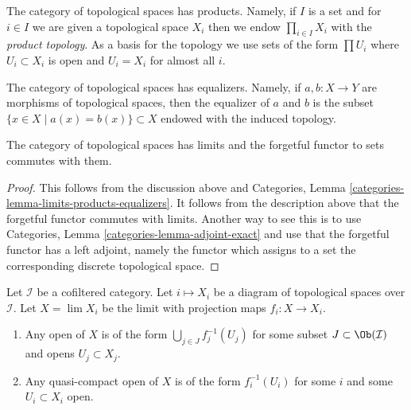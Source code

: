 \noindent
The category of topological spaces has products. Namely, if $I$ is a set
and for $i \in I$ we are given a topological space $X_i$ then we endow
$\prod_{i \in I} X_i$ with the {\it product topology}. As a basis for
the topology we use sets of the form $\prod U_i$ where $U_i \subset X_i$
is open and $U_i = X_i$ for almost all $i$.

\medskip\noindent
The category of topological spaces has equalizers. Namely, if
$a, b : X \to Y$ are morphisms of topological spaces, then the
equalizer of $a$ and $b$ is the subset $\{x \in X \mid a(x) = b(x)\} \subset X$
endowed with the induced topology.

\begin{lemma}
\label{lemma-limits}
The category of topological spaces has limits and the forgetful functor
to sets commutes with them.
\end{lemma}

\begin{proof}
This follows from the discussion above and
Categories, Lemma \ref{categories-lemma-limits-products-equalizers}.
It follows from the description above that the forgetful functor
commutes with limits. Another way to see this is to use
Categories, Lemma \ref{categories-lemma-adjoint-exact} and use that
the forgetful functor has a left adjoint, namely the functor which
assigns to a set the corresponding discrete topological space.
\end{proof}

\begin{lemma}
\label{lemma-describe-limits}
Let $\mathcal{I}$ be a cofiltered category. Let $i \mapsto X_i$ be a diagram
of topological spaces over $\mathcal{I}$. Let $X = \lim X_i$ be the limit
with projection maps $f_i : X \to X_i$.
\begin{enumerate}
\item Any open of $X$ is of the form $\bigcup_{j \in J} f_j^{-1}(U_j)$
for some subset $J \subset \Ob(\mathcal{I})$ and opens $U_j \subset X_j$.
\item Any quasi-compact open of $X$ is of the form
$f_i^{-1}(U_i)$ for some $i$ and some $U_i \subset X_i$ open.
\end{enumerate}
\end{lemma}

